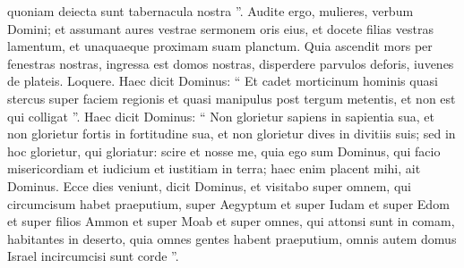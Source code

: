 \begin{biblechapter}
\begin{biblechapter}
\begin{biblechapter}
\begin{biblechapter}
\begin{biblechapter}
\begin{biblechapter}
\begin{biblechapter}
\begin{biblechapter}
\begin{biblechapter}
 quoniam deiecta sunt tabernacula nostra ”.
 \verse Audite ergo, mulieres, verbum Domini;
 et assumant aures vestrae sermonem oris eius,
 et docete filias vestras lamentum,
 et unaquaeque proximam suam planctum.
 \verse Quia ascendit mors per fenestras nostras,
 ingressa est domos nostras,
 disperdere parvulos deforis,
 iuvenes de plateis.
 \verse Loquere. Haec dicit Dominus:
 “ Et cadet morticinum hominis
 quasi stercus super faciem regionis
 et quasi manipulus post tergum metentis,
 et non est qui colligat ”.
 \verse Haec dicit Dominus:
 “ Non glorietur sapiens in sapientia sua,
 et non glorietur fortis in fortitudine sua,
 et non glorietur dives in divitiis suis;
 \verse sed in hoc glorietur, qui gloriatur:
 scire et nosse me,
 quia ego sum Dominus, qui facio misericordiam
 et iudicium et iustitiam in terra;
 haec enim placent mihi,
 ait Dominus.
 \verse Ecce dies veniunt, dicit Dominus, et visitabo super omnem, qui circumcisum habet praeputium, 
\verse super Aegyptum et super Iudam et super Edom et super filios Ammon et super Moab et super omnes, qui attonsi sunt in comam, habitantes in deserto, quia omnes gentes habent praeputium, omnis autem domus Israel incircumcisi sunt corde ”.
 

\end{biblechapter}
\end{biblechapter}
\end{biblechapter}
\end{biblechapter}
\end{biblechapter}
\end{biblechapter}
\end{biblechapter}
\end{biblechapter}
\end{biblechapter}
